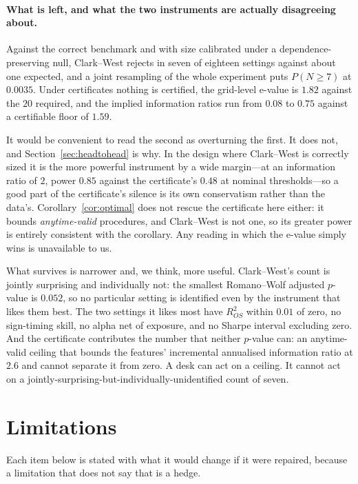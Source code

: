 \documentclass{article}
\theoremstyle{plain}
\theoremstyle{definition}
\newcommand{\rsq}{R^2_{OS}}
\begin{document}
\paragraph{What is left, and what the two instruments are actually disagreeing about.}
Against the correct benchmark and with size calibrated under a dependence-preserving null,
Clark--West rejects in seven of eighteen settings against about one expected, and a joint
resampling of the whole experiment puts $P(N\ge7)$ at $0.0035$. Under certificates nothing is
certified, the grid-level e-value is $1.82$ against the $20$ required, and the implied
information ratios run from $0.08$ to $0.75$ against a certifiable floor of $1.59$.

It would be convenient to read the second as overturning the first. It does not, and
Section~\ref{sec:headtohead} is why. In the design where Clark--West is correctly sized it is
the more powerful instrument by a wide margin---at an information ratio of $2$, power $0.85$
against the certificate's $0.48$ at nominal thresholds---so a good part of the certificate's
silence is its own conservatism rather than the data's. Corollary~\ref{cor:optimal} does not
rescue the certificate here either: it bounds \emph{anytime-valid} procedures, and Clark--West
is not one, so its greater power is entirely consistent with the corollary. Any reading in
which the e-value simply wins is unavailable to us.

What survives is narrower and, we think, more useful. Clark--West's count is jointly
surprising and individually not: the smallest Romano--Wolf adjusted $p$-value is $0.052$, so
no particular setting is identified even by the instrument that likes them best. The two
settings it likes most have $\rsq$ within $0.01$ of zero, no sign-timing skill, no alpha net of exposure,
and no Sharpe interval excluding zero. And the certificate contributes the number that neither
$p$-value can: an anytime-valid ceiling that bounds the features' incremental annualised
information ratio at $2.6$ and cannot separate it from zero. A desk can act on a ceiling. It
cannot act on a jointly-surprising-but-individually-unidentified count of seven.

\section{Limitations}
\label{sec:limitations}

Each item below is stated with what it would change if it were repaired, because a
limitation that does not say that is a hedge.
\end{document}
